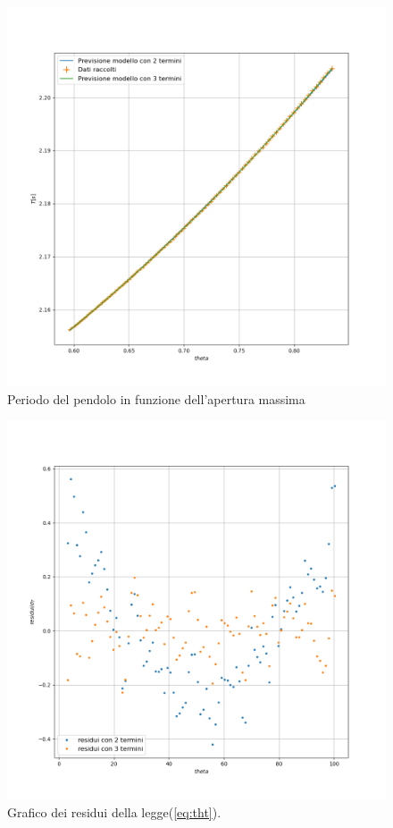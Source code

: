\documentclass{article}
\begin{document}
\begin{figure}[h!]
	\includegraphics[width=\textwidth]{Plot_Periods-Theta.png}
	\caption{Periodo del pendolo in funzione dell'apertura massima}
	\label{fig:pth}
\end{figure}

\begin{figure}[h!]
	\includegraphics[width=\textwidth]{Residuals_period_law.png}
	\caption{Grafico dei residui della legge(\ref{eq:tht}).}
	\label{fig:ptres}
\end{figure}
\end{document}
